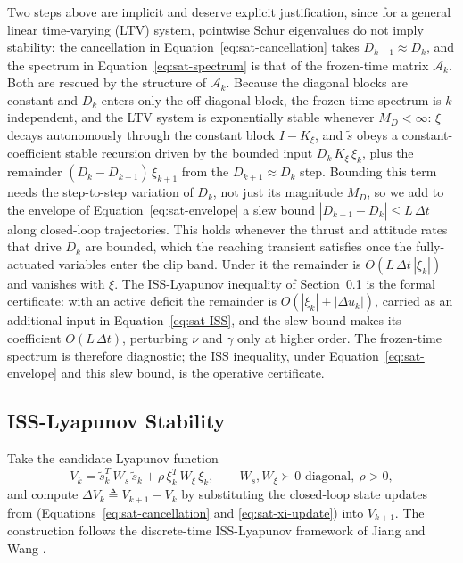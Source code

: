 \documentclass[conf]{new-aiaa}
\begin{document}
Two steps above are implicit and deserve explicit justification, since for a general linear time-varying (LTV) system, pointwise Schur eigenvalues do not imply stability: the cancellation in Equation~\ref{eq:sat-cancellation} takes $D_{k+1} \approx D_k$, and the spectrum in Equation~\ref{eq:sat-spectrum} is that of the frozen-time matrix $\mathcal{A}_k$. Both are rescued by the structure of $\mathcal{A}_k$. Because the diagonal blocks are constant and $D_k$ enters only the off-diagonal block, the frozen-time spectrum is $k$-independent, and the LTV system is exponentially stable whenever $M_D < \infty$: $\xi$ decays autonomously through the constant block $I - K_\xi$, and $\tilde s$ obeys a constant-coefficient stable recursion driven by the bounded input $D_k\, K_\xi\, \xi_k$, plus the remainder $(D_k - D_{k+1})\, \xi_{k+1}$ from the $D_{k+1} \approx D_k$ step. Bounding this term needs the step-to-step variation of $D_k$, not just its magnitude $M_D$, so we add to the envelope of Equation~\ref{eq:sat-envelope} a slew bound $|D_{k+1} - D_k| \leq L\, \Delta t$ along closed-loop trajectories. This holds whenever the thrust and attitude rates that drive $D_k$ are bounded, which the reaching transient satisfies once the fully-actuated variables enter the clip band. Under it the remainder is $O(L\,\Delta t\,|\xi_k|)$ and vanishes with $\xi$. The ISS-Lyapunov inequality of Section~\ref{sec:sat-iss} is the formal certificate: with an active deficit the remainder is $O(|\xi_k| + |\Delta u_k|)$, carried as an additional input in Equation~\ref{eq:sat-ISS}, and the slew bound makes its coefficient $O(L\,\Delta t)$, perturbing $\nu$ and $\gamma$ only at higher order. The frozen-time spectrum is therefore diagnostic; the ISS inequality, under Equation~\ref{eq:sat-envelope} and this slew bound, is the operative certificate.

\subsection{ISS-Lyapunov Stability}
\label{sec:sat-iss}

Take the candidate Lyapunov function
\small
\begin{equation}
\label{eq:sat-lyap}
V_k = \tilde s_k^T\, W_s\, \tilde s_k + \rho\, \xi_k^T\, W_\xi\, \xi_k,
\qquad W_s, W_\xi \succ 0 \text{ diagonal},\ \rho > 0,
\end{equation}
\normalsize
and compute $\Delta V_k \triangleq V_{k+1} - V_k$ by substituting the closed-loop state updates from (Equations~\ref{eq:sat-cancellation} and \ref{eq:sat-xi-update}) into $V_{k+1}$. The construction follows the discrete-time ISS-Lyapunov framework of Jiang and Wang \cite{refs:JiangWang2001}.
\end{document}
